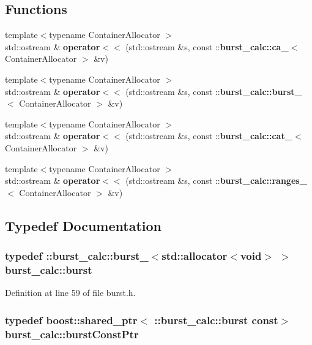 \subsection*{\-Functions}
\begin{DoxyCompactItemize}
\item 
{\footnotesize template$<$typename Container\-Allocator $>$ }\\std\-::ostream \& {\bf operator$<$$<$} (std\-::ostream \&s, const \-::{\bf burst\-\_\-calc\-::ca\-\_\-}$<$ \-Container\-Allocator $>$ \&v)
\item 
{\footnotesize template$<$typename Container\-Allocator $>$ }\\std\-::ostream \& {\bf operator$<$$<$} (std\-::ostream \&s, const \-::{\bf burst\-\_\-calc\-::burst\-\_\-}$<$ \-Container\-Allocator $>$ \&v)
\item 
{\footnotesize template$<$typename Container\-Allocator $>$ }\\std\-::ostream \& {\bf operator$<$$<$} (std\-::ostream \&s, const \-::{\bf burst\-\_\-calc\-::cat\-\_\-}$<$ \-Container\-Allocator $>$ \&v)
\item 
{\footnotesize template$<$typename Container\-Allocator $>$ }\\std\-::ostream \& {\bf operator$<$$<$} (std\-::ostream \&s, const \-::{\bf burst\-\_\-calc\-::ranges\-\_\-}$<$ \-Container\-Allocator $>$ \&v)
\end{DoxyCompactItemize}


\subsection{\-Typedef \-Documentation}
\subsubsection[{burst}]{\setlength{\rightskip}{0pt plus 5cm}typedef \-::{\bf burst\-\_\-calc\-::burst\-\_\-}$<$std\-::allocator$<$void$>$ $>$ {\bf burst\-\_\-calc\-::burst}}\label{namespaceburst__calc_a3382b3cf35ba4d17efcc40b3054d82ac}


\-Definition at line 59 of file burst.\-h.

\subsubsection[{burst\-Const\-Ptr}]{\setlength{\rightskip}{0pt plus 5cm}typedef boost\-::shared\-\_\-ptr$<$ \-::{\bf burst\-\_\-calc\-::burst} const$>$ {\bf burst\-\_\-calc\-::burst\-Const\-Ptr}}\label{namespaceburst__calc_ad27fc33af4df0efc3e98c35597823db6}


